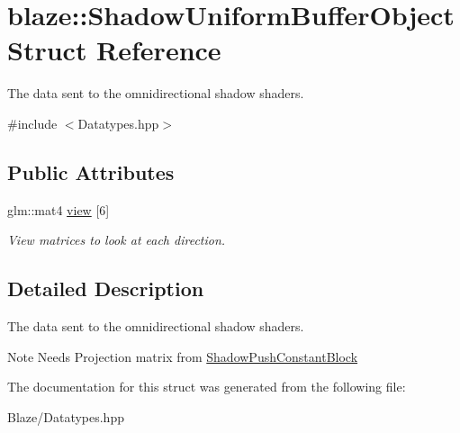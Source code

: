 \hypertarget{structblaze_1_1ShadowUniformBufferObject}{}\section{blaze\+:\+:Shadow\+Uniform\+Buffer\+Object Struct Reference}
\label{structblaze_1_1ShadowUniformBufferObject}


The data sent to the omnidirectional shadow shaders.  




{\ttfamily \#include $<$Datatypes.\+hpp$>$}

\subsection*{Public Attributes}
\begin{DoxyCompactItemize}
\item 
\mbox{\label{structblaze_1_1ShadowUniformBufferObject_af88bdd1cbcb8f005481a62dfd520c92a}} 
glm\+::mat4 \hyperlink{structblaze_1_1ShadowUniformBufferObject_af88bdd1cbcb8f005481a62dfd520c92a}{view} \mbox{[}6\mbox{]}
\begin{DoxyCompactList}\small\item\em View matrices to look at each direction. \end{DoxyCompactList}\end{DoxyCompactItemize}


\subsection{Detailed Description}
The data sent to the omnidirectional shadow shaders. 

\begin{DoxyNote}{Note}
Needs Projection matrix from \hyperlink{structblaze_1_1ShadowPushConstantBlock}{Shadow\+Push\+Constant\+Block} 
\end{DoxyNote}


The documentation for this struct was generated from the following file\+:\begin{DoxyCompactItemize}
\item 
Blaze/Datatypes.\+hpp\end{DoxyCompactItemize}
